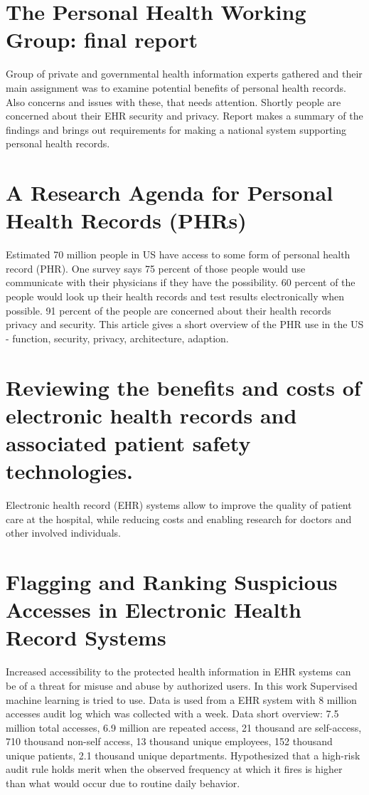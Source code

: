 \documentclass[12pt]{article}
\begin{document}
\section{The Personal Health Working Group: final report}
Group of private and governmental health information experts gathered and their main assignment was to examine potential benefits of personal health records. Also concerns and issues with these, that needs attention.
Shortly people are concerned about their EHR security and privacy. 
Report makes a summary of the findings and brings out requirements for making a national system supporting personal health records.  \cite{connecting2003personal}

\section{A Research Agenda for Personal Health Records (PHRs)}
Estimated 70 million people in US have access to some form of personal health record (PHR). One survey says 75 percent of those people would use communicate with their physicians if they have the possibility. 60 percent of the people would look up their health records and test results electronically when possible. 
91 percent of the people are concerned about their health records privacy and security.  
This article gives a short overview of the PHR use in the US - function, security, privacy, architecture, adaption. 
\cite{10.1197/jamia.M2547}

\section{Reviewing the benefits and costs of electronic health records and associated patient safety technologies.}
Electronic health record (EHR) systems allow to improve the quality of patient care at the hospital, while reducing costs and enabling research for doctors and other involved individuals. \cite{Menachemi2006}

\section{Flagging and Ranking Suspicious Accesses in Electronic Health Record Systems}
Increased accessibility to the protected health information in EHR systems can be of a threat for misuse and abuse by authorized users.
\cite{hedda2018flagging} 
In this work Supervised machine learning is tried to use. Data is used from a EHR system with 8 million accesses audit log which was collected with a week. Data short overview: 7.5 million total accesses, 6.9 million are repeated access, 21 thousand are self-access, 710 thousand non-self access, 13 thousand unique employees, 152 thousand unique patients, 2.1 thousand unique departments.
Hypothesized that a high-risk audit rule holds merit when the observed frequency at which it fires is higher than what would occur due to routine daily behavior. 
\end{document}
